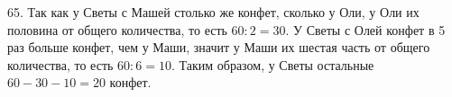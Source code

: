 65. Так как у Светы с Машей столько же конфет, сколько у Оли, у Оли их половина от общего количества, то есть $60:2=30.$ У Светы с Олей конфет в 5 раз больше конфет, чем у Маши, значит у Маши их шестая часть от общего количества, то есть $60:6=10.$ Таким образом, у Светы остальные $60-30-10=20$ конфет.\\
